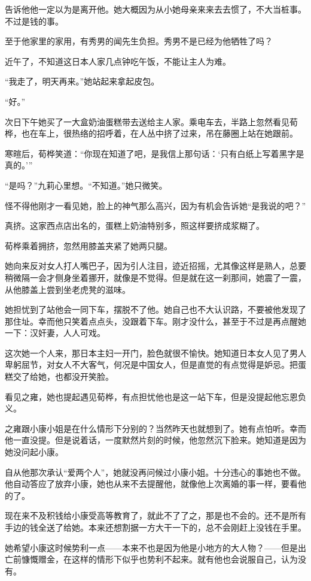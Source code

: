 \par 告诉他他一定以为是离开他。她大概因为从小她母亲来来去去惯了，不大当桩事。不过是钱的事。
\par 至于他家里的家用，有秀男的闻先生负担。秀男不是已经为他牺牲了吗？
\par 近午了，不知道这日本人家几点钟吃午饭，不能让主人为难。
\par “我走了，明天再来。”她站起来拿起皮包。
\par “好。”
\par 次日下午她买了一大盒奶油蛋糕带去送给主人家。乘电车去，半路上忽然看见荀桦，也在车上，很热络的招呼着，在人丛中挤了过来，吊在藤圈上站在她跟前。
\par 寒暄后，荀桦笑道：“你现在知道了吧，是我信上那句话：‘只有白纸上写着黑字是真的。'”
\par “是吗？”九莉心里想。“不知道。”她只微笑。
\par 怪不得他刚才一看见她，脸上的神气那么高兴，因为有机会告诉她“是我说的吧？”
\par 真挤。这家西点店出名的，蛋糕上奶油特别多，照这样要挤成浆糊了。
\par 荀桦乘着拥挤，忽然用膝盖夹紧了她两只腿。
\par 她向来反对女人打人嘴巴子，因为引人注目，迹近招摇，尤其像这样是熟人，总要稍微隔一会才侧身坐着挪开，就像是不觉得。但是就在这一刹那间，她震了一震，从他膝盖上尝到坐老虎凳的滋味。
\par 她担忧到了站他会一同下车，摆脱不了他。她自己也不大认识路，不要被他发现了那住址。幸而他只笑着点点头，没跟着下车。刚才没什么，甚至于不过是再点醒她一下：汉奸妻，人人可戏。
\par 这次她一个人来，那日本主妇一开门，脸色就很不愉快。她知道日本女人见了男人卑躬屈节，对女人不大客气，何况是中国女人，但是直觉的有点觉得是妒忌。把蛋糕交了给她，也都没开笑脸。
\par 看见之雍，她也提起遇见荀桦，有点担忧他也是这一站下车，但是没提起他忘恩负义。
\par 之雍跟小康小姐是在什么情形下分别的？当然昨天也就想到了。她有点怕听。幸而他一直没提。但是说着话，一度默然片刻的时候，他忽然沉下脸来。她知道是因为她没问起小康。
\par 自从他那次承认“爱两个人”，她就没再问候过小康小姐。十分违心的事她也不做。他自动答应了放弃小康，她也从来不去提醒他，就像他上次离婚的事一样，要看他的了。
\par 现在来不及积钱给小康受高等教育了，就此不了了之，那是也不会的。还不是所有手边的钱全送了给她。本来还想割据一方大干一下的，总不会刚赶上没钱在手里。
\par 她希望小康这时候势利一点——本来不也是因为他是小地方的大人物？——但是出亡前慷慨赠金，在这样的情形下似乎也势利不起来。就有他也会说服自己，认为没有。
